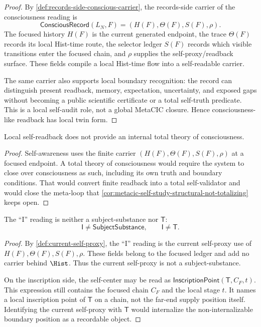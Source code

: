 \begin{proof}
By \autoref{def:records-side-conscious-carrier}, the records-side carrier
of the consciousness reading is
$$
\mathsf{ConsciousRecord}(L_N,F)
=
(H(F),\Theta(F),S(F),\rho).
$$
The focused history $H(F)$ is the current generated endpoint, the trace
$\Theta(F)$ records its local Hist-time route, the selector ledger $S(F)$
records which visible transitions enter the focused chain, and $\rho$
supplies the self-proxy/readback surface. These fields compile a local
Hist-time flow into a self-readable carrier.

The same carrier also supports local boundary recognition: the record can
distinguish present readback, memory, expectation, uncertainty, and
exposed gaps without becoming a public scientific certificate or a total
self-truth predicate. This is a local self-audit role, not a global
MetaCIC closure. Hence consciousness-like readback has local twin form.
\end{proof}

\begin{corollary}
\label{cor:self-awareness-not-total-theory-consciousness}
Local self-readback does not provide an internal total theory of
consciousness.
\end{corollary}

\begin{proof}
Self-awareness uses the finite carrier
$(H(F),\Theta(F),S(F),\rho)$ at a focused endpoint. A total theory of
consciousness would require the system to close over consciousness as
such, including its own truth and boundary conditions. That would convert
finite readback into a total self-validator and would close the
meta-loop that \autoref{cor:metacic-self-study-structural-not-totalizing}
keeps open.
\end{proof}

\begin{theorem}
\label{thm:current-self-proxy-not-subject-substance-or-t}
The ``I'' reading is neither a subject-substance nor $\mathsf{T}$:
$$
\mathsf{I}\neq\mathsf{SubjectSubstance},
\qquad
\mathsf{I}\neq\mathsf{T}.
$$
\end{theorem}

\begin{proof}
By \autoref{def:current-self-proxy}, the ``I'' reading is the current
self-proxy use of $H(F),\Theta(F),S(F),\rho$. These fields belong to the
focused ledger and add no carrier behind $\Hist$. Thus the current
self-proxy is not a subject-substance.

On the inscription side, the self-center may be read as
$\mathsf{InscriptionPoint}(\mathsf{T},C_F,t)$. This expression still
contains the focused chain $C_F$ and the local stage $t$. It names a local
inscription point of $\mathsf{T}$ on a chain, not the far-end supply
position itself. Identifying the current self-proxy with $\mathsf{T}$
would internalize the non-internalizable boundary position as a recordable
object.
\end{proof}

